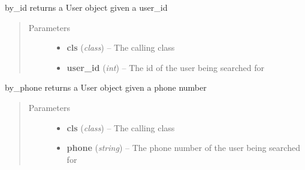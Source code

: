\documentclass[letterpaper,10pt,english]{sphinxmanual}
\begin{document}
\begin{fulllineitems}
\begin{fulllineitems}
\end{fulllineitems}


\begin{fulllineitems}
\label{dev-patients:cagenix.patients.models.Patient.by_id}
by\_id returns a User object given a user\_id
\begin{quote}\begin{description}
\item[{Parameters}] \leavevmode\begin{itemize}
\item {} 
\textbf{cls} (\emph{class}) -- The calling class

\item {} 
\textbf{user\_id} (\emph{int}) -- The id of the user being searched for

\end{itemize}

\end{description}\end{quote}

\end{fulllineitems}


\begin{fulllineitems}
\label{dev-patients:cagenix.patients.models.Patient.by_phone}
by\_phone returns a User object given a phone number
\begin{quote}\begin{description}
\item[{Parameters}] \leavevmode\begin{itemize}
\item {} 
\textbf{cls} (\emph{class}) -- The calling class

\item {} 
\textbf{phone} (\emph{string}) -- The phone number of the user being searched for

\end{itemize}

\end{description}\end{quote}

\end{fulllineitems}


\end{fulllineitems}
\end{document}
